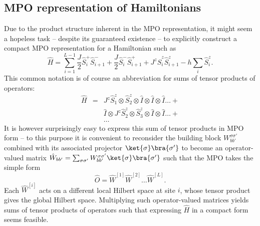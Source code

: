 \subsection{MPO representation of Hamiltonians}
Due to the product structure inherent in the MPO representation, it might seem a hopeless task  -- despite its guaranteed existence -- to explicitly construct a compact MPO representation for a Hamiltonian such as
\begin{equation}
\hat{H} = \sum_{i=1}^{L-1} \frac{J}{2}\hat{S}^+_i \hat{S}^-_{i+1} + \frac{J}{2}\hat{S}^-_i \hat{S}^+_{i+1} + J^z \hat{S}^z_i \hat{S}^z_{i+1} - h\sum_{i} \hat{S}^z_i .
\end{equation}
This common notation is of course an abbreviation for sums of tensor products of operators:
\begin{eqnarray*}
\hat{H} &=& J^z\hat{S}^z_1 \otimes \hat{S}^z_2 \otimes \hat{I} \otimes \hat{I} \otimes \hat{I} \ldots + \\
 & & \hat{I} \otimes J^z\hat{S}^z_2 \otimes \hat{S}^z_3 \otimes \hat{I} \otimes \hat{I} \ldots + \\
 & & \ldots
 \end{eqnarray*}
It is however surprisingly easy to express this sum of tensor products in MPO form \cite{McCulloch07} -- to this purpose it is convenient to reconsider the building block $W^{\sigma\sigma'}_{bb'}$ combined with its associated projector $\ket{\sigma}\bra{\sigma'}$ to become an operator-valued matrix $\hat{W}_{bb'} = \sum_{\sigma\sigma'} W^{\sigma\sigma'}_{bb'} \ket{\sigma}\bra{\sigma'}$ such that the MPO takes the simple form
\begin{equation}
\hat{O} = \hat{W}^{[1]}\hat{W}^{[2]} \ldots \hat{W}^{[L]} .
\end{equation}
Each $\hat{W}^{[i]}$ acts on a different local Hilbert space at site $i$, whose tensor product gives the global Hilbert space. Multiplying such operator-valued matrices yields sums of tensor products of operators such that expressing $\hat{H}$ in a compact form seems feasible. 

